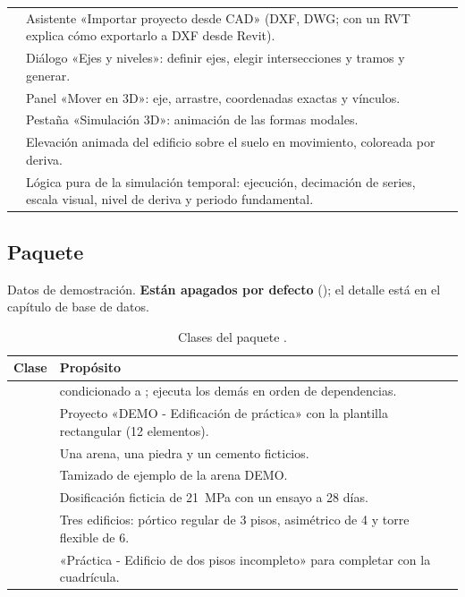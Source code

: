 \begin{longtable}{L{6.2cm}L{8.6cm}}
	 & Asistente «Importar proyecto desde CAD» (DXF, DWG; con un RVT explica cómo
	exportarlo a DXF desde Revit). \\
	 & Diálogo «Ejes y niveles»: definir ejes, elegir intersecciones y tramos y generar. \\
	 & Panel «Mover en 3D»: eje, arrastre, coordenadas exactas y vínculos. \\
	 & Pestaña «Simulación 3D»: animación de las formas modales. \\
	 & Elevación animada del edificio sobre el suelo en movimiento, coloreada por deriva. \\
	 & Lógica pura de la simulación temporal: ejecución, decimación de series, escala visual,
	nivel de deriva y periodo fundamental. \\
\end{longtable}

\subsection{Paquete }

Datos de demostración. \textbf{Están apagados por defecto} (); el detalle está en el
capítulo de base de datos.

\begin{table}[H]
	\centering
	\caption{Clases del paquete .}
	\label{tab:est-seeder}
	\begin{tabular}{L{6.2cm}L{8.6cm}}
		\hline
		\textbf{Clase} & \textbf{Propósito} \\ \hline
		 &  condicionado a ; ejecuta los
		demás en orden de dependencias. \\
		 & Proyecto «DEMO - Edificación de práctica» con la plantilla rectangular (12 elementos). \\
		 & Una arena, una piedra y un cemento ficticios. \\
		 & Tamizado de ejemplo de la arena DEMO. \\
		 & Dosificación ficticia de 21~MPa con un ensayo a 28 días. \\
		 & Tres edificios: pórtico regular de 3 pisos, asimétrico de 4 y torre flexible de 6. \\
		 & «Práctica - Edificio de dos pisos incompleto» para completar con la cuadrícula. \\ \hline
	\end{tabular}
\end{table}

